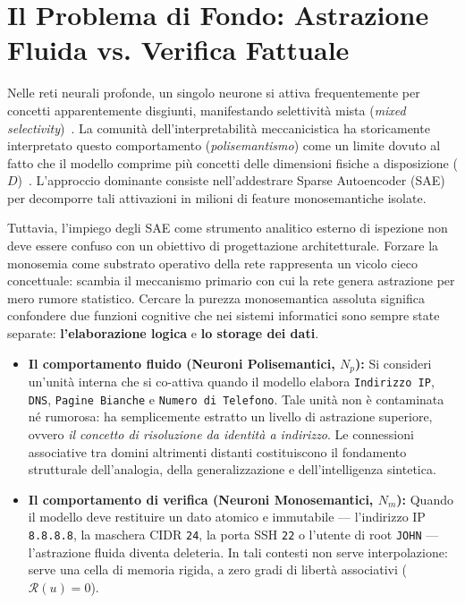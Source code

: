 \documentclass[11pt,a4paper]{article}
\theoremstyle{definition}
\begin{document}
\section{Il Problema di Fondo: Astrazione Fluida vs. Verifica Fattuale}

Nelle reti neurali profonde, un singolo neurone si attiva frequentemente per concetti apparentemente disgiunti, manifestando selettività mista (\textit{mixed selectivity})~\cite{rigotti2013importance, fusi2016why, elhage2022toy}. La comunità dell'interpretabilità meccanicistica ha storicamente interpretato questo comportamento (\textit{polisemantismo}) come un limite dovuto al fatto che il modello comprime più concetti delle dimensioni fisiche a disposizione ($D$)~\cite{elhage2022toy}. L'approccio dominante consiste nell'addestrare Sparse Autoencoder (SAE)~\cite{bricken2023monosemanticity, templeton2024scaling} per decomporre tali attivazioni in milioni di feature monosemantiche isolate.

Tuttavia, l'impiego degli SAE come strumento analitico esterno di ispezione non deve essere confuso con un obiettivo di progettazione architetturale. Forzare la monosemia come substrato operativo della rete rappresenta un vicolo cieco concettuale: scambia il meccanismo primario con cui la rete genera astrazione per mero rumore statistico. Cercare la purezza monosemantica assoluta significa confondere due funzioni cognitive che nei sistemi informatici sono sempre state separate: \textbf{l'elaborazione logica} e \textbf{lo storage dei dati}.

\begin{itemize}[leftmargin=*, itemsep=2.5pt, topsep=3.0pt]
    \item \textbf{Il comportamento fluido (Neuroni Polisemantici, $N_p$):} Si consideri un'unità interna che si co-attiva quando il modello elabora \texttt{Indirizzo IP}, \texttt{DNS}, \texttt{Pagine Bianche} e \texttt{Numero di Telefono}. Tale unità non è contaminata né rumorosa: ha semplicemente estratto un livello di astrazione superiore, ovvero \textit{il concetto di risoluzione da identità a indirizzo}. Le connessioni associative tra domini altrimenti distanti costituiscono il fondamento strutturale dell'analogia, della generalizzazione e dell'intelligenza sintetica.
    \item \textbf{Il comportamento di verifica (Neuroni Monosemantici, $N_m$):} Quando il modello deve restituire un dato atomico e immutabile — l'indirizzo IP \texttt{8.8.8.8}, la maschera CIDR \texttt{24}, la porta SSH \texttt{22} o l'utente di root \texttt{JOHN} — l'astrazione fluida diventa deleteria. In tali contesti non serve interpolazione: serve una cella di memoria rigida, a zero gradi di libertà associativi ($\mathcal{R}(u)=0$).
\end{itemize}
\end{document}
